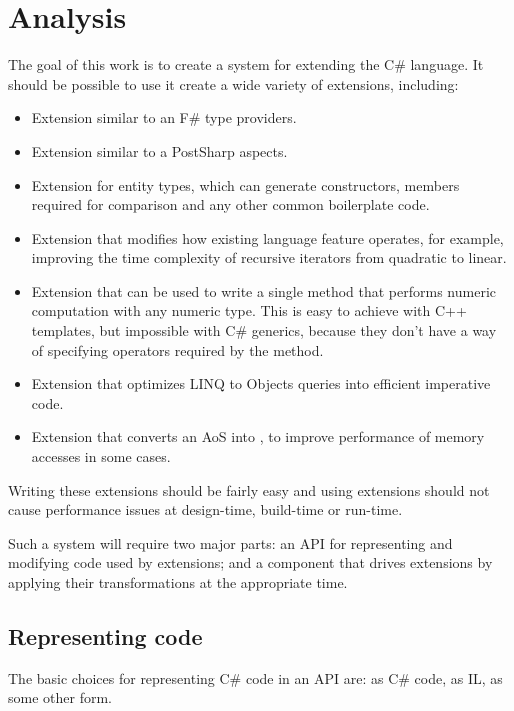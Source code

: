 \chapter{Analysis}

The goal of this work is to create a system for extending the C\# language. It should be possible to use it create a wide variety of extensions, including:

\begin{itemize}
\item Extension similar to an F\# type providers.
\item Extension similar to a PostSharp aspects.
\item Extension for entity types, which can generate constructors, members required for comparison and any other common boilerplate code.
\item Extension that modifies how existing language feature operates, for example, improving the time complexity of recursive iterators from quadratic to linear.
\item Extension that can be used to write a single method that performs numeric computation with any numeric type. This is easy to achieve with C++ templates, but impossible with C\# generics, because they don't have a way of specifying operators required by the method.
\item Extension that optimizes LINQ to Objects queries into efficient imperative code.
\item Extension that converts an \ac{AoS} into , to improve performance of memory accesses in some cases.
\end{itemize}


Writing these extensions should be fairly easy and using extensions should not cause performance issues at design-time, build-time or run-time.

\medskip

Such a system will require two major parts: an \ac{API} for representing and modifying code used by extensions; and a component that drives extensions by applying their transformations at the appropriate time.

\section{Representing code}

The basic choices for representing C\# code in an \ac{API} are: as C\# code, as \ac{IL}, as some other form.

